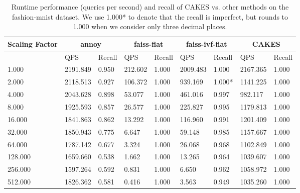 \begin{table}[!t]
    \caption{Runtime performance (queries per second) and recall of CAKES vs. other methods on the fashion-mnist dataset. We use 1.000* to denote that the recall is imperfect, but rounds to 1.000 when we consider only three decimal places.}
    \label{table:results:ann-fashion}
    \vskip 0.15in
    \begin{center}
        \begin{small}
            \begin{sc}
                \begin{tabular}{|l|p{1cm}|p{1cm}|p{1cm}|p{1cm}|p{1cm}|p{1cm}|p{1cm}|p{1cm}|}
                    \hline
                    \textbf{Scaling Factor}  & \multicolumn{2}{|c|}{\textbf{annoy}} & \multicolumn{2}{|c|}{\textbf{faiss-flat}} & \multicolumn{2}{|c|}{\textbf{faiss-ivf-flat}}  & \multicolumn{2}{|c|}{\textbf{CAKES}} \\
                    \hline
                    &             QPS & Recall        & QPS & Recall      & QPS & Recall       & QPS & Recall       \\
                    \hline
                    1.000 & 2191.849 & 0.950 & 212.602 & 1.000 & 2009.483 & 1.000 & 2167.365 & 1.000 \\
                    \hline
                    2.000 & 2118.513 & 0.927 & 106.372 & 1.000 & 939.169 & 1.000* & 1141.225 & 1.000 \\
                    \hline
                    4.000 & 2043.628 & 0.898 & 53.077 & 1.000 & 461.016 & 0.997 & 982.117 & 1.000 \\
                    \hline
                    8.000 & 1925.593 & 0.857 & 26.577 & 1.000 & 225.827 & 0.995 & 1179.813 & 1.000 \\
                    \hline
                    16.000 & 1841.863 & 0.862 & 13.292 & 1.000 & 116.960 & 0.991 & 1201.409 & 1.000 \\
                    \hline
                    32.000 & 1850.943 & 0.775 & 6.647 & 1.000 & 59.148 & 0.985 & 1157.667 & 1.000 \\
                    \hline
                    64.000 & 1787.142 & 0.677 & 3.324 & 1.000 & 26.068 & 0.968 & 1102.849 & 1.000 \\
                    \hline
                    128.000 & 1659.660 & 0.538 & 1.662 & 1.000 & 13.265 & 0.964 & 1039.607 & 1.000 \\
                    \hline
                    256.000 & 1597.264 & 0.592 & 0.831 & 1.000 & 6.650 & 0.962 & 1058.972 & 1.000 \\
                    \hline
                    512.000 & 1826.362 & 0.581 & 0.416 & 1.000 & 3.563 & 0.949 & 1035.260 & 1.000 \\
                    \hline
                \end{tabular}
            \end{sc}
        \end{small}
    \end{center}
    \vskip -0.1in
\end{table}

